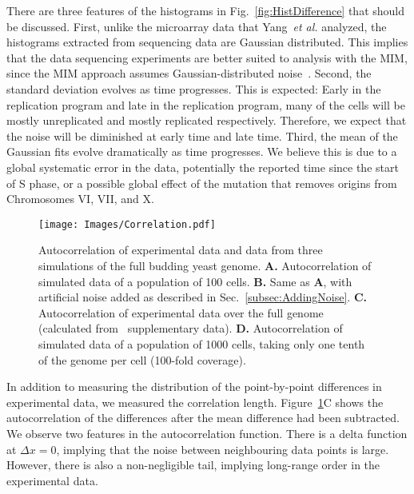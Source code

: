 		There are three features of the histograms in Fig.~\ref{fig:HistDifference} that should be discussed.
		First, unlike the microarray data that Yang~\emph{et al.} analyzed, the histograms extracted from sequencing data are Gaussian distributed.
		This implies that the data sequencing experiments are better suited to analysis with the MIM, since the MIM approach assumes Gaussian-distributed noise~\cite{ScottsPaper}.
		Second, the standard deviation evolves as time progresses.
		This is expected: Early in the replication program and late in the replication program, many of the cells will be mostly unreplicated and mostly replicated  respectively.
		Therefore, we expect that the noise will be diminished at early time and late time.
		Third, the mean of the Gaussian fits evolve dramatically as time progresses.
		We believe this is due to a global systematic error in the data, potentially the reported time since the start of S phase, or a possible global effect of the mutation that removes origins from Chromosomes VI, VII, and X.
		
		\begin{figure}[tbh]
			\begin{center}
				\texttt{[image: Images/Correlation.pdf]}
			\end{center}
				\caption[Autocorrelation of Experiment and Simulations]{\label{fig:correlation}
					Autocorrelation of experimental data and data from three simulations of the full budding yeast genome.
					\textbf{A.} Autocorrelation of simulated data of a population of 100 cells.
					\textbf{B.} Same as \textbf{A}, with artificial noise added as described in Sec.~\ref{subsec:AddingNoise}.
					\textbf{C.} Autocorrelation of experimental data  over the full genome (calculated from~\cite{StochasticTermination} supplementary data).
					\textbf{D.} Autocorrelation of simulated data of a population of 1000 cells, taking only one tenth of the genome per cell (100-fold coverage).
				}
		\end{figure}
		
		In addition to measuring the distribution of the point-by-point differences in experimental data, we measured the correlation length.
		Figure~\ref{fig:correlation}C shows the autocorrelation of the differences after the mean difference had been subtracted.
		We observe two features in the autocorrelation function.
		There is a delta function at $\Delta x=0$, implying that the noise between neighbouring data points is large.
		However, there is also a non-negligible tail, implying long-range order in the experimental data.
		
